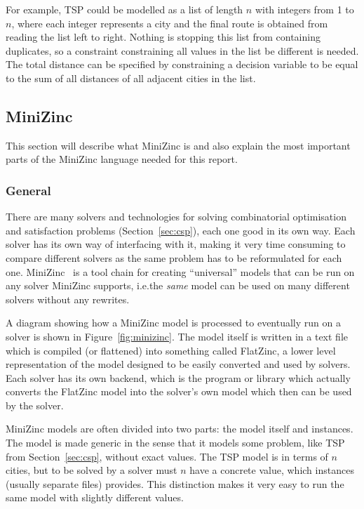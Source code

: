 \documentclass[a4paper,12pt]{article}
\begin{document}
For example, TSP could be modelled as a list of length $n$ with integers from 1 to $n$,
where each integer represents a city and the final route is obtained from reading the list
left to right. Nothing is stopping this list from containing duplicates, so a constraint
constraining all values in the list be different is needed. The total distance can be
specified by constraining a decision variable to be equal to the sum of all distances of
all adjacent cities in the list.


\subsection{MiniZinc}\label{sec:mzn}
This section will describe what MiniZinc is and also explain
the most important parts of the MiniZinc language needed for this report.

\subsubsection{General}
There are many solvers and technologies for solving combinatorial optimisation and
satisfaction problems (Section~\ref{sec:csp}), each one good in its own way. Each solver
has its own way of interfacing with it, making it very time consuming to compare different
solvers as the same problem has to be reformulated for each one. MiniZinc~\cite{MiniZinc}
is a tool chain for creating ``universal'' models that can be run on any solver MiniZinc
supports, i.e.\@ the \emph{same} model can be used on many different solvers without any
rewrites.

A diagram showing how a MiniZinc model is processed to eventually run on a
solver is shown in Figure~\ref{fig:minizinc}. The model itself is written in a text file
which is compiled (or flattened) into something called FlatZinc, a lower level
representation of the model designed to be easily converted and used by solvers. Each
solver has its own backend, which is the program or library which actually converts the
FlatZinc model into the solver's own model which then can be used by the solver.



MiniZinc models are often divided into two parts: the model itself and instances. The
model is made generic in the sense that it models some problem, like TSP from
Section~\ref{sec:csp}, without exact values. The TSP model is in terms of $n$ cities, but
to be solved by a solver must $n$ have a concrete value, which instances (usually separate
files) provides. This distinction makes it very easy to run the same model with slightly
different values.
\end{document}

